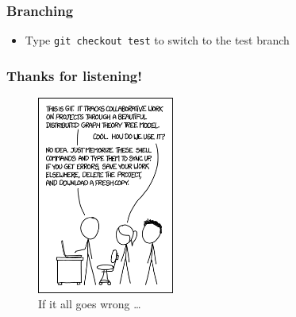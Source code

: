 \documentclass{beamer}
\begin{document}
\begin{frame}
\frametitle{Branching}
\begin{itemize}
	\item Type \texttt{git checkout test} to switch to the test branch 
\end{itemize}
\end{frame}



\begin{frame}
\frametitle{Thanks for listening!}
\begin{figure}[H]
	\centering
	\includegraphics[width=0.4\textwidth]{xkcdgit.png}
	\caption{If it all goes wrong \ldots \footnotemark }
	\label{fig:xkcdversion}
\end{figure}
\end{frame}
\end{document}
